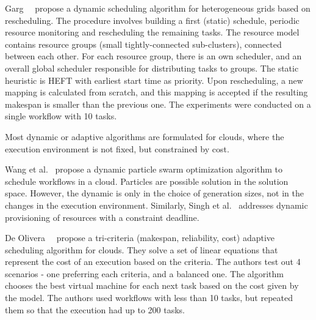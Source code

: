 \documentclass[conference]{IEEEtran}
\begin{document}
    Garg~\etal~\cite{GARG2015256} propose a dynamic scheduling algorithm for heterogeneous grids based on rescheduling.
    The procedure involves building a first (static) schedule, periodic resource monitoring and rescheduling the remaining
    tasks.
    The resource model contains resource groups (small tightly-connected sub-clusters), connected between each other.
    For each resource group, there is an own scheduler, and an overall global scheduler responsible for distributing
    tasks to groups.
    The static heuristic is HEFT with earliest start time as priority.
    Upon rescheduling, a new mapping is calculated from scratch, and this mapping is accepted if the resulting makespan
    is smaller than the previous one.
    The experiments were conducted on a single workflow with 10 tasks.
%



    Most dynamic or adaptive algorithms are formulated for clouds, where the execution environment is not fixed,
    but constrained by cost.

    Wang et al.~\cite{wang2019dynamic} propose a dynamic particle swarm optimization algorithm to schedule workflows in a cloud.
    Particles are possible solution in the solution space.
    However, the dynamic is only in the choice of generation sizes, not in the changes in the execution environment.
    Similarly, Singh et al.~\cite{singh2018novel} addresses dynamic provisioning of resources with a constraint deadline.

    De Olivera~\etal~\cite{de2012provenance} propose a tri-criteria (makespan, reliability, cost) adaptive scheduling algorithm
    for clouds.
    They solve a set of linear equations that represent the cost of an execution based on the criteria.
    The authors test out 4 scenarios - one preferring each criteria, and a balanced one.
    The algorithm chooses the best virtual machine for each next task based on the cost given by the model.
    The authors used workflows with less than 10 tasks, but repeated them so that the execution had up to 200 tasks.
\end{document}
